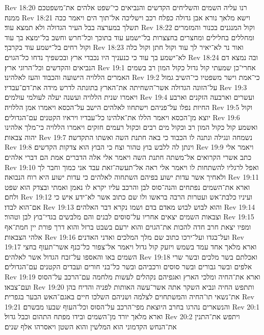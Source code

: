 Rev 18:20  רנו עליה השמים והשליחים הקדשים והנביאים כי־שפט אלהים את־משפטכם ממנה׃
Rev 18:21  וישא מלאך נורא אבן גדולה כפלח רכב וישליכה אל־תוך הים ויאמר ככה תשלך במערצה בבל העיר הגדולה ולא תמצא עוד׃
Rev 18:22  וקול המנגנים בכנור והמזמרים ומחללים בחלילים ומחצרים בחצצרות בל־ישמע עוד בתוכך וכל־חרש וחשב בל־ימצא בך עוד וקול רחים בל־ישמע עוד בקרבך׃
Rev 18:23  ואור נר לא־יאיר לך עוד וקול חתן וקול כלה לא־ישמע בך עוד כי כנעניך היו נכבדי ארץ ובכשפיך נדחו כל־הגוים׃
Rev 18:24  ובה נמצא דם הנביאים והקדשים וכל־הרוגי ארץ׃
Rev 19:1  אחרי־כן שמעתי קול גדול כקול המון רב בשמים האמרים הללויה הישועה והכבוד והעז לאלהינו׃
Rev 19:2  כי־אמת וישר משפטיו כי־השיב גמול על־הזונה הגדולה אשר־השחיתה את־הארץ בתזנתה לדרש מידה את־דם־עבדיו׃
Rev 19:3  ויאמרו שנית הללויה ועשנה יעלה לעולמי עולמים׃
Rev 19:4  ועשרים וארבעה הזקנים וארבע החיות נפלו על־פניהם וישתחוו לאלהים הישב על־הכסא ויאמרו אמן הללויה׃
Rev 19:5  וקול יוצא מן־הכסא ויאמר הללו את־אלהינו כל־עבדיו ויראיו הקטנים עם־הגדולים׃
Rev 19:6  ואשמע קול כקול המון רב וכקול מים רבים וכקול רעמים חזקים ויאמרו הללויה כי־מלך אלהינו יהוה צבאות׃
Rev 19:7  נשמחה ונגילה ונתנה לו הכבוד כי באה חתנת השה ואשתו התקדשה׃
Rev 19:8  וינתן לה ללבש בוץ טהור וצח כי הבוץ הוא צדקות הקדשים׃
Rev 19:9  ויאמר אלי כתב אשרי הקרואים אל־משתה חתנת השה ויאמר אלי אלה הדברים אמת הם דברי אלהים׃
Rev 19:10  ואפל לרגליו להשתחות לו ויאמר אלי ראה אל־תעשה־זאת עבד אני כמוך וחבר לך ולאחיך אשר עדות ישוע בפיהם השתחוה לאלהים כי עדות ישוע היא רוח הנבואה׃
Rev 19:11  וארא את־השמים נפתחים והנה־סוס לבן והרכב עליו יקרא לו נאמן ואמתי ובצדק הוא שפט ולחם׃
Rev 19:12  ועיניו כלבת־אש ועטרות הרבה בראשו ולו שם כתוב אשר לא־ידע איש כי אם־הוא לבדו׃
Rev 19:13  והוא לבוש לבוש מאדם בדם ושמו נקרא דבר האלהים׃
Rev 19:14  וצבאות השמים יצאים אחריו על־סוסים לבנים והם מלבשים בגדי־בוץ לבן וטהור׃
Rev 19:15  ומפיו יצאת חרב חדה להכות את־הגוים והוא ירעם בשבט ברזל והוא דרך פורת יין חמת־אף אלהי הצבאות׃
Rev 19:16  ועל־בגדו ועל־ירכו כתוב שם מלך המלכים ואדני האדנים׃
Rev 19:17  וארא מלאך אחד עמד בשמש ויזעק קול גדול ויאמר אל־צפור כל־כנף אשר־תעוף בחצי השמים באו והאספו על־זבח הגדול אשר לאלהים׃
Rev 19:18  ואכלתם בשר מלכים ובשר שרי אלפים ובשר גבורים ובשר סוסים ורכביהם ובשר כל־בני חורים ועבדים הקטנים עם־הגדולים׃
Rev 19:19  וארא את־החיה ומלכי הארץ ואגפיהם נקהלים לעשות מלחמה עם־הרכב על־הסוס ועם־צבאו׃
Rev 19:20  ותתפש החיה ונביא השקר אתה אשר־עשה האותות לפניה והדיח בהן את־נשאי תו־החיה והמשתחוים לצלמה ושניהם השלכו חיים באגם־האש הבער בגפרית׃
Rev 19:21  והנשארים נהרגו בחרב היוצאת מפי־הרכב על־הסוס וכל־העוף שבעו מבשרם׃
Rev 20:1  וארא מלאך יורד מן־השמים ובידו מפתח התהום וכבל גדול׃
Rev 20:2  ויתפש את־התנין את־הנחש הקדמוני הוא המלשין והוא השטן ויאסרהו אלף שנים׃
